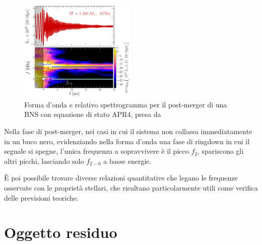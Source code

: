 
\begin{figure}
	\vspace{-15pt}
	\begin{center}
		\includegraphics[width=0.5\textwidth]{figures/Capitolo_1/GW_spectrogram_APR4-q10-M1300.pdf}
	\end{center}
	\vspace{-10pt}
	\caption{Forma d'onda e relativo spettrogramma per il post-merger di una BNS con equazione di stato APR4, presa da \cite{Rezzolla_2016}}
	\label{fig:spettrogramma_postmerger_APR4}
	\vspace{-40pt}
\end{figure}

Nella fase di post-merger, nei casi in cui il sistema non collassa immediatamente in un buco nero, evidenziando nella forma d'onda una fase di ringdown in cui il segnale si spegne, l'unica frequenza a sopravvivere è il picco $f_2$, spariscono gli altri picchi, lasciando solo $f_{2-0}$ a basse energie.

È poi possibile trovare diverse relazioni quantitative che legano le frequenze osservate con le proprietà stellari, che risultano particolarmente utili come verifica delle previsioni teoriche.









\section{Oggetto residuo}
\label{section:residual}

